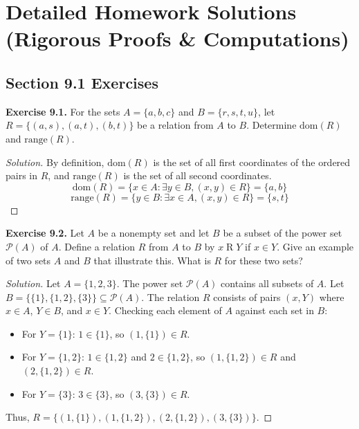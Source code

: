 \documentclass[11pt, a4paper]{article}
\theoremstyle{definition}
\theoremstyle{remark}
\newcommand{\dom}{\text{dom}}
\newcommand{\range}{\text{range}}
\begin{document}
\newpage

\section{Detailed Homework Solutions (Rigorous Proofs \& Computations)}

\subsection{Section 9.1 Exercises}

\textbf{Exercise 9.1.} For the sets $A = \{a, b, c\}$ and $B = \{r, s, t, u\}$, let $R = \{(a, s), (a, t), (b, t)\}$ be a relation from $A$ to $B$. Determine $\dom(R)$ and $\range(R)$.
\begin{proof}[Solution]
By definition, $\dom(R)$ is the set of all first coordinates of the ordered pairs in $R$, and $\range(R)$ is the set of all second coordinates.
\[ \dom(R) = \{ x \in A : \exists y \in B, (x, y) \in R \} = \{a, b\} \]
\[ \range(R) = \{ y \in B : \exists x \in A, (x, y) \in R \} = \{s, t\} \]
\end{proof}

\vspace{1em}
\textbf{Exercise 9.2.} Let $A$ be a nonempty set and let $B$ be a subset of the power set $\mathcal{P}(A)$ of $A$. Define a relation $R$ from $A$ to $B$ by $x \mathrel{R} Y$ if $x \in Y$. Give an example of two sets $A$ and $B$ that illustrate this. What is $R$ for these two sets?
\begin{proof}[Solution]
Let $A = \{1, 2, 3\}$. The power set $\mathcal{P}(A)$ contains all subsets of $A$. Let $B = \{\{1\}, \{1, 2\}, \{3\}\} \subseteq \mathcal{P}(A)$.
The relation $R$ consists of pairs $(x, Y)$ where $x \in A$, $Y \in B$, and $x \in Y$.
Checking each element of $A$ against each set in $B$:
\begin{itemize}
    \item For $Y = \{1\}$: $1 \in \{1\}$, so $(1, \{1\}) \in R$.
    \item For $Y = \{1, 2\}$: $1 \in \{1, 2\}$ and $2 \in \{1, 2\}$, so $(1, \{1, 2\}) \in R$ and $(2, \{1, 2\}) \in R$.
    \item For $Y = \{3\}$: $3 \in \{3\}$, so $(3, \{3\}) \in R$.
\end{itemize}
Thus, $R = \{ (1, \{1\}), (1, \{1, 2\}), (2, \{1, 2\}), (3, \{3\}) \}$.
\end{proof}
\end{document}
